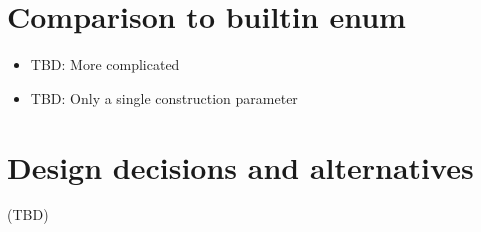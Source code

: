 \documentclass[letterpaper,10pt,english]{sphinxmanual}
\begin{document}
\section{Comparison to built\sphinxhyphen{}in enum}
\label{\detokenize{enums:comparison-to-built-in-enum}}\begin{itemize}
\item {} 
\sphinxAtStartPar
TBD: More complicated

\item {} 
\sphinxAtStartPar
TBD: Only a single construction parameter

\end{itemize}


\section{Design decisions and alternatives}
\label{\detokenize{enums:design-decisions-and-alternatives}}
\sphinxAtStartPar
(TBD)


\renewcommand{\indexname}{Python Module Index}
\begin{sphinxtheindex}
\let\bigletter\sphinxstyleindexlettergroup
\bigletter{g}
\item\relax{}
\end{sphinxtheindex}

\renewcommand{\indexname}{Index}
\printindex
\end{document}
